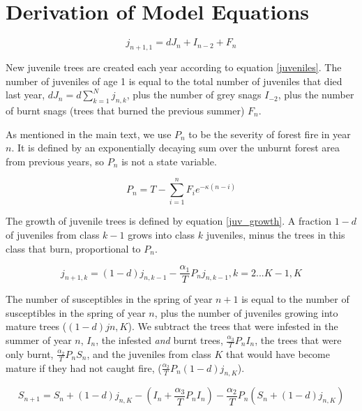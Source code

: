 


\section{Derivation of Model Equations}


\begin{equation}
j_{n+1, 1} = d J_n + I_{n-2} + F_n
\label{juveniles}
\end{equation}


New juvenile trees are created each year according to equation \ref{juveniles}. The number of juveniles of age 1 is equal to the total number of juveniles that died last year, $d J_n =  d \sum_{k = 1}^{N} j_{n,k}$, plus the number of grey snags $I_{-2}$, plus the number of burnt snags (trees that burned the previous summer) $F_n$. 

As mentioned in the main text, we use $P_n$ to be the severity of forest fire in year $n$. It is defined by an exponentially decaying sum over the unburnt forest area from previous years, so $P_n$ is not a state variable.  

\begin{equation}
  P_{n} = T - \sum_{i=1}^{n}  F_i e^{-\kappa (n - i)} 
\end{equation}

The growth of juvenile trees is defined by equation \ref{juv_growth}. A fraction $1-d$ of juveniles from class $k-1$ grows into class $k$ juveniles, minus the trees in this class that burn, proportional to $P_n$. 

\begin{equation}
  j_{n+1, k} = (1-d) j_{n, k - 1} - \frac{\alpha_1}{T}P_n j_{n,k-1}, k = 2 ... K-1 ,K
  \label{juv_growth}
  \end{equation}
  


 The number of susceptibles in the spring of year $n+1$ is equal to the number of susceptibles in the spring of year $n$, plus the number of juveniles growing into mature trees ($(1 - d) j {n, K} $). We subtract the trees that were infested in the summer of year $n$, $I_n$, the infested \textit{and} burnt trees, $\frac{\alpha_3}{T} P_n I_n$, the trees that were only burnt, $\frac{\alpha_2}{T} P_n S_n$, and the juveniles from class $K$ that would have become mature if they had not caught fire, ($\frac{\alpha_2}{T} P_n (1-d) j_{n, K}$).

\begin{equation}
S_{n+1} = S_n + (1 - d) j_{n, K} - (I_n + \frac{\alpha_3}{T} P_n I_n) - \frac{\alpha_2}{T} P_n \left( S_n + (1-d) j_{n, K}\right)
\end{equation}


